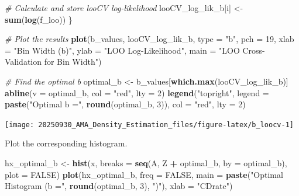 \documentclass[
]{article}
\newenvironment{Shaded}{\begin{snugshade}}{\end{snugshade}}
\newcommand{\AttributeTok}[1]{\textcolor[rgb]{0.13,0.29,0.53}{#1}}
\newcommand{\CommentTok}[1]{\textcolor[rgb]{0.56,0.35,0.01}{\textit{#1}}}
\newcommand{\ConstantTok}[1]{\textcolor[rgb]{0.56,0.35,0.01}{#1}}
\newcommand{\DecValTok}[1]{\textcolor[rgb]{0.00,0.00,0.81}{#1}}
\newcommand{\FunctionTok}[1]{\textcolor[rgb]{0.13,0.29,0.53}{\textbf{#1}}}
\newcommand{\NormalTok}[1]{#1}
\newcommand{\OtherTok}[1]{\textcolor[rgb]{0.56,0.35,0.01}{#1}}
\newcommand{\SpecialCharTok}[1]{\textcolor[rgb]{0.81,0.36,0.00}{\textbf{#1}}}
\newcommand{\StringTok}[1]{\textcolor[rgb]{0.31,0.60,0.02}{#1}}
\begin{document}
\begin{Shaded}
\begin{Highlighting}[]
  \CommentTok{\# Calculate and store looCV log{-}likelihood}
\NormalTok{  looCV\_log\_lik\_b[i] }\OtherTok{\textless{}{-}} \FunctionTok{sum}\NormalTok{(}\FunctionTok{log}\NormalTok{(f\_loo))}
\NormalTok{\}}

\CommentTok{\# Plot the results}
\FunctionTok{plot}\NormalTok{(b\_values, looCV\_log\_lik\_b, }\AttributeTok{type =} \StringTok{"b"}\NormalTok{, }\AttributeTok{pch =} \DecValTok{19}\NormalTok{,}
     \AttributeTok{xlab =} \StringTok{"Bin Width (b)"}\NormalTok{, }\AttributeTok{ylab =} \StringTok{"LOO Log{-}Likelihood"}\NormalTok{,}
     \AttributeTok{main =} \StringTok{"LOO Cross{-}Validation for Bin Width"}\NormalTok{)}

\CommentTok{\# Find the optimal b}
\NormalTok{optimal\_b }\OtherTok{\textless{}{-}}\NormalTok{ b\_values[}\FunctionTok{which.max}\NormalTok{(looCV\_log\_lik\_b)]}
\FunctionTok{abline}\NormalTok{(}\AttributeTok{v =}\NormalTok{ optimal\_b, }\AttributeTok{col =} \StringTok{"red"}\NormalTok{, }\AttributeTok{lty =} \DecValTok{2}\NormalTok{)}
\FunctionTok{legend}\NormalTok{(}\StringTok{"topright"}\NormalTok{, }\AttributeTok{legend =} \FunctionTok{paste}\NormalTok{(}\StringTok{"Optimal b ="}\NormalTok{, }\FunctionTok{round}\NormalTok{(optimal\_b, }\DecValTok{3}\NormalTok{)), }\AttributeTok{col =} \StringTok{"red"}\NormalTok{, }\AttributeTok{lty =} \DecValTok{2}\NormalTok{)}
\end{Highlighting}
\end{Shaded}

\begin{center}\texttt{[image: 20250930\_AMA\_Density\_Estimation\_files/figure-latex/b\_loocv-1]} \end{center}

Plot the corresponding histogram.

\begin{Shaded}
\begin{Highlighting}[]
\NormalTok{hx\_optimal\_b }\OtherTok{\textless{}{-}} \FunctionTok{hist}\NormalTok{(x, }\AttributeTok{breaks =} \FunctionTok{seq}\NormalTok{(A, Z }\SpecialCharTok{+}\NormalTok{ optimal\_b, }\AttributeTok{by =}\NormalTok{ optimal\_b), }\AttributeTok{plot =} \ConstantTok{FALSE}\NormalTok{)}
\FunctionTok{plot}\NormalTok{(hx\_optimal\_b, }\AttributeTok{freq =} \ConstantTok{FALSE}\NormalTok{,}
     \AttributeTok{main =} \FunctionTok{paste}\NormalTok{(}\StringTok{"Optimal Histogram (b ="}\NormalTok{, }\FunctionTok{round}\NormalTok{(optimal\_b, }\DecValTok{3}\NormalTok{), }\StringTok{")"}\NormalTok{),}
     \AttributeTok{xlab =} \StringTok{"CDrate"}\NormalTok{)}
\end{Highlighting}
\end{Shaded}
\end{document}
